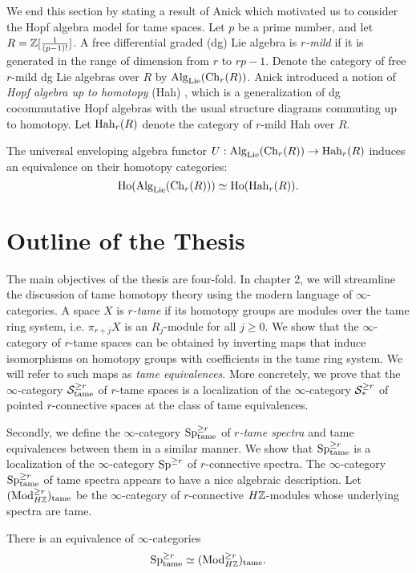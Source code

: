 We end this section by stating a result of Anick \cite{AnickHopf} which motivated us to consider the Hopf algebra model for tame spaces.
Let $p$ be a prime number, and let $R={\mathbb{Z}}[{\frac{1}{(p-1)!}}]$. 
A free differential graded (dg) Lie algebra is \emph{$r$-mild}  if it is generated in the range of dimension from $r$ to $rp-1$. Denote the category of free $r$-mild dg Lie algebras over $R$  by $\operatorname{Alg}_{\operatorname{Lie}}(\operatorname{Ch}_{r}(R))$. Anick introduced a notion of \emph{Hopf algebra up to homotopy} (Hah) \cite[Definition 4.1]{AnickHopf}, which is a generalization of dg cocommutative Hopf algebras with the usual structure diagrams commuting up to homotopy. Let $\operatorname{Hah}_{r}(R)$ denote the category of $r$-mild Hah over $R$.

\begin{theorem}
The universal enveloping algebra functor $U:\operatorname{Alg}_{\operatorname{Lie}}(\operatorname{Ch}_{r}(R))\rightarrow \operatorname{Hah}_{r}(R)$ induces an equivalence on their homotopy categories:
$$
\operatorname{Ho}(\operatorname{Alg}_{\operatorname{Lie}}(\operatorname{Ch}_{r}(R)) )\simeq \operatorname{Ho}(\operatorname{Hah}_{r}(R)).
$$
\end{theorem}


\section{Outline of the Thesis}
The main objectives of the thesis are four-fold.
In chapter 2, we will streamline the discussion of tame homotopy theory using the modern language of $\infty$-categories.
A space $X$ is \emph{$r$-tame} if its homotopy groups are modules over the tame ring system, i.e.
$\pi_{r+j}X$ is an $R_j$-module for all $j\geq 0$.
We show that the $\infty$-category of $r$-tame spaces can be obtained by inverting maps that induce isomorphisms on homotopy groups with coefficients in the tame ring system. We will refer to such maps as \emph{tame equivalences}.
More concretely, we prove that the $\infty$-category ${\mathcal{S}}^{\geq r}_{\operatorname{\operatorname{tame}}}$ of $r$-tame spaces is a localization of the $\infty$-category ${\mathcal{S}}^{\geq r}_*$ of pointed $r$-connective spaces at the class of tame equivalences.

Secondly, we define the $\infty$-category $\operatorname{Sp}^{\geq r}_{\operatorname{\operatorname{tame}}}$ of \emph{$r$-tame spectra} and tame equivalences between them in a similar manner. We show that $\operatorname{Sp}^{\geq r}_{\operatorname{\operatorname{tame}}}$ is a localization of the $\infty$-category $\operatorname{Sp}^{\geq r}$ of $r$-connective spectra.
The $\infty$-category $\operatorname{Sp}^{\geq r}_{\operatorname{\operatorname{tame}}}$ of tame spectra appears to have a nice algebraic description.
Let $(\operatorname{Mod}_{H{\mathbb{Z}}}^{\geq r})_{\operatorname{\operatorname{tame}}}$ be the $\infty$-category of $r$-connective $H{\mathbb{Z}}$-modules whose underlying spectra are tame.
\begin{thmx}
\label{Theorem B}
There is an equivalence of $\infty$-categories
$$
\operatorname{Sp}^{\geq r}_{\operatorname{\operatorname{tame}}} \simeq (\operatorname{Mod}_{H{\mathbb{Z}}}^{\geq r})_{\operatorname{\operatorname{tame}}}.
$$
\end{thmx}


